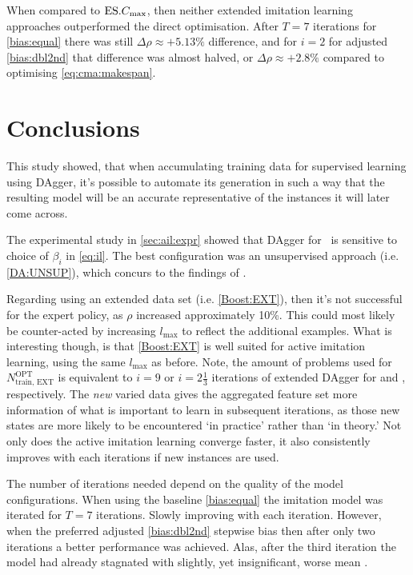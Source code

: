 When compared to $\text{ES}.{C_{\max}}$, then neither extended imitation learning 
approaches outperformed the direct optimisation. After $T=7$ iterations for 
\ref{bias:equal} there was still $\Delta\rho\approx+5.13\%$ difference, and for 
$i=2$ for adjusted \ref{bias:dbl2nd} that difference was almost halved, or 
$\Delta\rho\approx+2.8\%$ compared to optimising \cref{eq:cma:makespan}. 
						
\section{Conclusions}
This study showed, that when accumulating training data for supervised  
learning using DAgger, it's possible to automate its generation in such a way 
that the resulting model will be an accurate representative of the instances 
it will later come across. 
\pagebreak

The experimental study in \cref{sec:ail:expr} showed that DAgger for \jsp\ is 
sensitive to choice of $\beta_i$ in \cref{eq:il}. The best configuration was 
an unsupervised approach (i.e. \ref{DA:UNSUP}), which concurs to the findings 
of \cite{RossGB11}.

Regarding using an extended data set (i.e. \ref{Boost:EXT}), then it's not 
successful for the expert policy, as $\rho$ increased approximately 10\%. This 
could most likely be 
counter-acted by increasing $l_{\max}$ to reflect the additional examples.
What is interesting though, is that \ref{Boost:EXT} is well suited for 
active imitation learning, using the same $l_{\max}$ as before. 
Note, the amount of problems used for $N^{\text{OPT}}_{\text{train, EXT}}$ is 
equivalent to $i=9$ or $i=2\tfrac{1}{3}$ iterations of extended DAgger 
for \Problem[6\times5]{\train} and , respectively.
The \emph{new} varied data gives the aggregated feature set more information 
of what is important to learn in subsequent iterations, as those new states are 
more likely to be encountered `in practice' rather than `in theory.' 
Not only does the active imitation learning converge faster, it also 
consistently improves with each iterations if new instances are used.

The number of iterations needed depend on the quality of the model 
configurations. When using the baseline \ref{bias:equal} the imitation model 
was iterated for $T=7$ iterations. Slowly improving with each iteration.
However, when the preferred adjusted \ref{bias:dbl2nd} stepwise bias then after 
only two iterations a better performance was achieved. Alas, after the third 
iteration the model had already stagnated with slightly, yet insignificant, 
worse mean \namerho.


